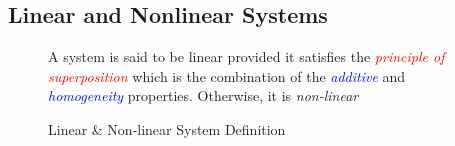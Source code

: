 \documentclass[../notes-main.tex]{subfiles}
\begin{document}
\subsection{Linear and Nonlinear Systems}
\begin{figure}[H]
    \centering
    \begin{mdframed}
        \begin{center}
            A system is said to be linear provided it satisfies the \textcolor{red}{\emph{principle of superposition}} which is the combination of the \textcolor{blue}{\emph{additive}} and \textcolor{blue}{\emph{homogeneity}} properties. Otherwise, it is \emph{non-linear}
        \end{center}
    \end{mdframed}\label{fig:linear-nonlinear-system-def-1}
    \vspace{-1em}\caption{Linear \& Non-linear System Definition}
\end{figure}
\end{document}
